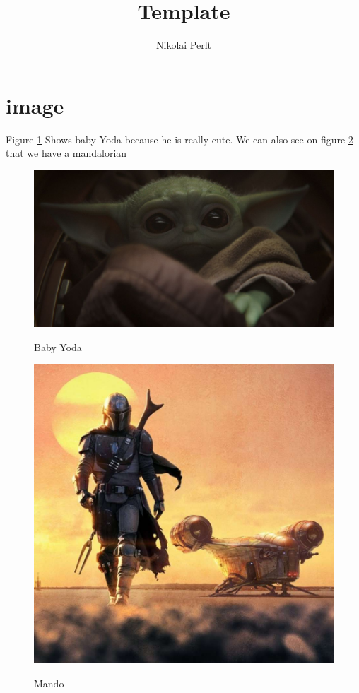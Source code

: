\documentclass[a4paper]{article}
\title{Template}
\author{Nikolai Perlt}
\begin{document}
    \maketitle
    \tableofcontents

    \section{image}
    Figure \ref{fig:babyYoda} Shows baby Yoda because he is really cute. We can also see on figure 
    \ref{fig:mando} that we have a mandalorian
   
    \begin{figure}
        \caption{Baby Yoda}
        \includegraphics[width=\linewidth]{images/babyYoda.jpg}
        \label{fig:babyYoda}
    \end{figure}

    \begin{figure}
        \caption{Mando}
        \includegraphics[width=\linewidth]{images/mando.jpg}
        \label{fig:mando}
    \end{figure}
\end{document}
